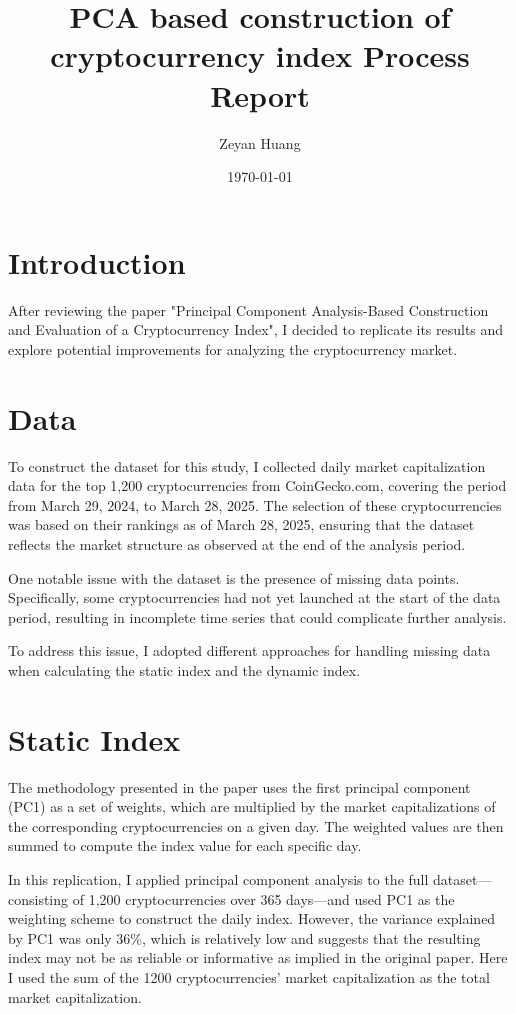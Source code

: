 \documentclass[12pt]{article}
\title{PCA based construction of cryptocurrency index Process Report}
\author{Zeyan Huang}
\date{\today}
\begin{document}
\maketitle

\begin{abstract}

\end{abstract}

\section{Introduction}
After reviewing the paper "Principal Component Analysis-Based Construction and Evaluation of a Cryptocurrency Index"\cite{1}, I decided to replicate its results and explore potential improvements for analyzing the cryptocurrency market.

\section{Data}
To construct the dataset for this study, I collected daily market capitalization data for the top 1,200 cryptocurrencies from CoinGecko.com, covering the period from March 29, 2024, to March 28, 2025. The selection of these cryptocurrencies was based on their rankings as of March 28, 2025, ensuring that the dataset reflects the market structure as observed at the end of the analysis period.

One notable issue with the dataset is the presence of missing data points. Specifically, some cryptocurrencies had not yet launched at the start of the data period, resulting in incomplete time series that could complicate further analysis.

To address this issue, I adopted different approaches for handling missing data when calculating the static index and the dynamic index.


\section{Static Index}
The methodology presented in the paper uses the first principal component (PC1) as a set of weights, which are multiplied by the market capitalizations of the corresponding cryptocurrencies on a given day. The weighted values are then summed to compute the index value for each specific day.

In this replication, I applied principal component analysis to the full dataset---consisting of 1,200 cryptocurrencies over 365 days---and used PC1 as the weighting scheme to construct the daily index. However, the variance explained by PC1 was only 36\%, which is relatively low and suggests that the resulting index may not be as reliable or informative as implied in the original paper.
Here I used the sum of the 1200 cryptocurrencies' market capitalization as the total market capitalization.
\end{document}
